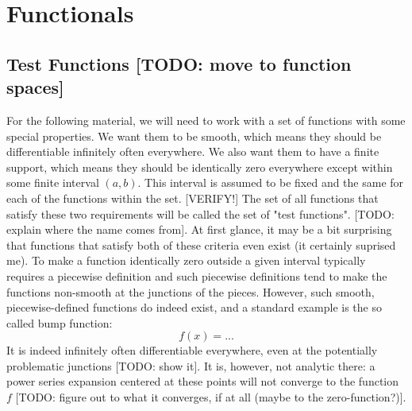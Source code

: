 \section{Functionals} 




\subsection{Test Functions  [TODO: move to function spaces]}
For the following material, we will need to work with a set of functions with some special properties. We want them to be smooth, which means they should be differentiable infinitely often everywhere. We also want them to have a finite support, which means they should be identically zero everywhere except within some finite interval $(a,b)$. This interval is assumed to be fixed and the same for each of the functions within the set. [VERIFY!] The set of all functions that satisfy these two requirements will be called the set of "test functions". [TODO: explain where the name comes from]. At first glance, it may be a bit surprising that functions that satisfy both of these criteria even exist (it certainly suprised me). To make a function identically zero outside a given interval typically requires a piecewise definition and such piecewise definitions tend to make the functions non-smooth at the junctions of the pieces. However, such smooth, piecewise-defined functions do indeed exist, and a standard example is the so called bump function:
\begin{equation}
 f(x) = ...
\end{equation}
It is indeed infinitely often differentiable everywhere, even at the potentially problematic junctions [TODO: show it]. It is, however, not analytic there: a power series expansion centered at these points will not converge to the function $f$ [TODO: figure out to what it converges, if at all (maybe to the zero-function?)].



